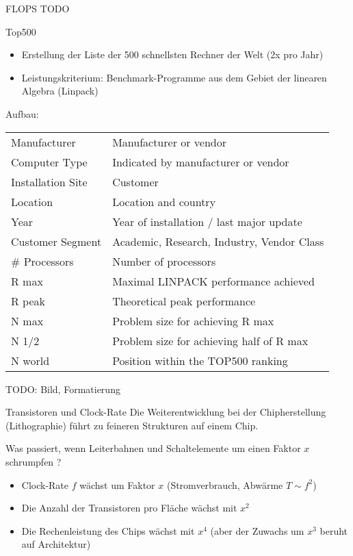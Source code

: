 \begin{example}[Leistungsmaß]{FLOPS}
    TODO
\end{example}

\begin{bonus}{Top500}
    \begin{itemize}
        \item Erstellung der Liste der 500 schnellsten Rechner der Welt (2x pro Jahr)
        \item Leistungskriterium: Benchmark-Programme aus dem Gebiet der linearen Algebra (Linpack)
    \end{itemize}
    Aufbau:
    \begin{tabular}{|l|l|}
        Manufacturer      & Manufacturer or vendor                     \\
        Computer Type     & Indicated by manufacturer or vendor        \\
        Installation Site & Customer                                   \\
        Location          & Location and country                       \\
        Year              & Year of installation / last major update   \\
        Customer Segment  & Academic, Research, Industry, Vendor Class \\
        \# Processors     & Number of processors                       \\
        R max             & Maximal LINPACK performance achieved       \\
        R peak            & Theoretical peak performance               \\
        N max             & Problem size for achieving R max           \\
        N 1/2             & Problem size for achieving half of R max   \\
        N world           & Position within the TOP500 ranking         \\
    \end{tabular}

    TODO: Bild, Formatierung
\end{bonus}

\begin{bonus}{Transistoren und Clock-Rate}
    Die Weiterentwicklung bei der Chipherstellung (Lithographie) führt zu feineren Strukturen auf einem Chip.

    Was passiert, wenn Leiterbahnen und Schaltelemente um einen Faktor $x$ schrumpfen ?
    \begin{itemize}
        \item Clock-Rate $f$ wächst um Faktor $x$ (Stromverbrauch, Abwärme $T \sim f^2$)
        \item Die Anzahl der Transistoren pro Fläche wächst mit $x^2$
        \item Die Rechenleistung des Chips wächst mit $x^4$ (aber der Zuwachs um $x^3$ beruht auf Architektur)
    \end{itemize}
\end{bonus}

